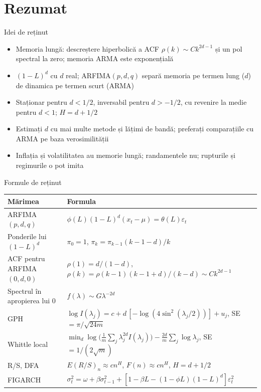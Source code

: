\section{Rezumat}

\begin{frame}{Idei de reținut}
\itemsize{\small}
\begin{itemize}
    \item Memoria lungă: descreștere hiperbolică a ACF $\rho(k) \sim Ck^{2d-1}$ și un pol spectral la zero; memoria ARMA este exponențială
    \item $(1-L)^d$ cu $d$ real; ARFIMA$(p,d,q)$ separă memoria pe termen lung ($d$) de dinamica pe termen scurt (ARMA)
    \item Staționar pentru $d < 1/2$, inversabil pentru $d > -1/2$, cu revenire la medie pentru $d < 1$; $H = d + 1/2$
    \item Estimați $d$ cu mai multe metode și lățimi de bandă; preferați comparațiile cu ARMA pe baza verosimilității
    \item Inflația și volatilitatea au memorie lungă; randamentele nu; rupturile și regimurile o pot imita
\end{itemize}
\end{frame}

\begin{frame}{Formule de reținut}
\itemsize{\small}
{\renewcommand{\arraystretch}{1.35}\begin{center}
\footnotesize
\begin{tabular}{ll}
\toprule
\textbf{Mărimea} & \textbf{Formula} \\
\midrule
ARFIMA$(p,d,q)$ & $\phi(L)(1-L)^d(x_t - \mu) = \theta(L)\varepsilon_t$ \\
Ponderile lui $(1-L)^d$ & $\pi_0 = 1$, \quad $\pi_k = \pi_{k-1}(k - 1 - d)/k$ \\
ACF pentru ARFIMA$(0,d,0)$ & $\rho(1) = d/(1-d)$, \quad $\rho(k) = \rho(k-1)(k-1+d)/(k-d) \sim Ck^{2d-1}$ \\
Spectrul în apropierea lui 0 & $f(\lambda) \sim G\lambda^{-2d}$ \\
GPH & $\log I(\lambda_j) = c + d\,[-\log(4\sin^2(\lambda_j/2))] + u_j$, \quad SE $= \pi/\sqrt{24m}$ \\
Whittle local & $\min_d \log\bigl(\tfrac1m\sum_j\lambda_j^{2d}I(\lambda_j)\bigr) - \tfrac{2d}{m}\sum_j\log\lambda_j$, \quad SE $= 1/(2\sqrt m)$ \\
R/S, DFA & $E(R/S)_n \approx cn^H$, \quad $F(n) \approx cn^H$, \quad $H = d + 1/2$ \\
FIGARCH & $\sigma_t^2 = \omega + \beta\sigma_{t-1}^2 + [1 - \beta L - (1 - \phi L)(1-L)^d]\varepsilon_t^2$ \\
\bottomrule
\end{tabular}
\end{center}
}
\end{frame}

